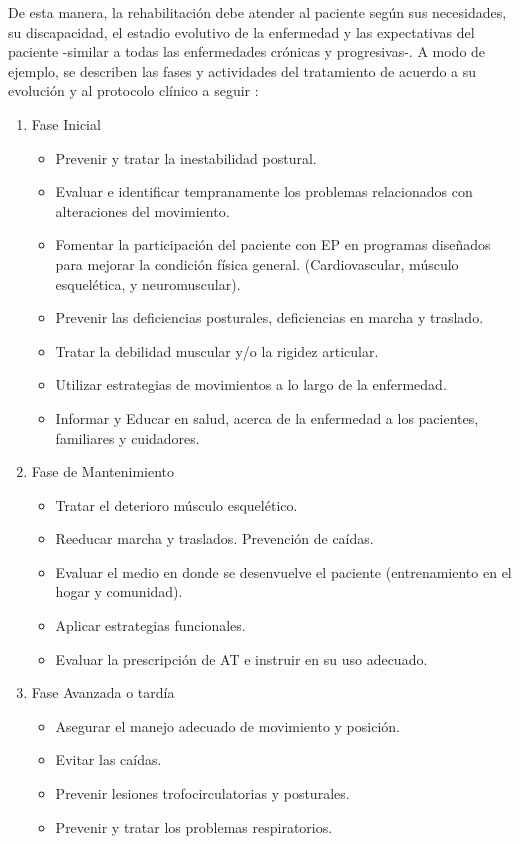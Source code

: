 De esta manera, la rehabilitación debe atender al paciente según sus necesidades, su discapacidad, el estadio evolutivo de la enfermedad y las expectativas del paciente -similar a todas las enfermedades crónicas y progresivas-. 
A modo de ejemplo, se describen las fases y actividades del tratamiento de acuerdo a su evolución y al protocolo clínico a seguir \cite{MINISTERIO2010}:

\begin{enumerate}
    \item Fase Inicial
    \begin{itemize}
        \item Prevenir y tratar la inestabilidad postural.
        \item Evaluar e identificar tempranamente los problemas relacionados con alteraciones del movimiento.
        \item Fomentar la participación del paciente con EP en programas diseñados para mejorar la condición física general. (Cardiovascular, músculo esquelética, y neuromuscular).
        \item Prevenir las deficiencias posturales, deficiencias en marcha y traslado.
        \item Tratar la debilidad muscular y/o la rigidez articular.
        \item Utilizar estrategias de movimientos a lo largo de la enfermedad.
        \item Informar y Educar en salud, acerca de la enfermedad a los pacientes, familiares y cuidadores.
    \end{itemize}   

    \item Fase de Mantenimiento
    \begin{itemize}
        \item Tratar el deterioro músculo esquelético.
        \item Reeducar marcha y traslados. Prevención de caídas.
        \item Evaluar el medio en donde se desenvuelve el paciente (entrenamiento en el hogar y comunidad).
        \item Aplicar estrategias funcionales.
        \item Evaluar la prescripción de AT e instruir en su uso adecuado.
    \end{itemize}

    \item Fase Avanzada o tardía
    \begin{itemize}
        \item Asegurar el manejo adecuado de movimiento y posición.
        \item Evitar las caídas.
        \item Prevenir lesiones trofocirculatorias y posturales.
        \item Prevenir y tratar los problemas respiratorios.
    \end{itemize}
\end{enumerate}

